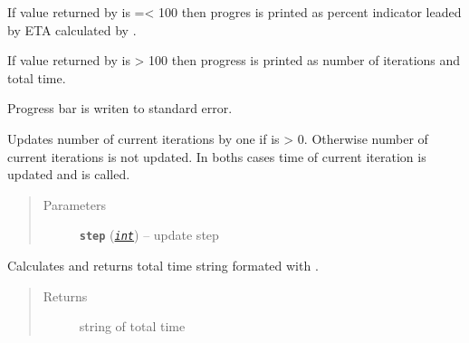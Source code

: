 \documentclass[a4paper,10pt,english]{sphinxmanual}
\begin{document}
\begin{fulllineitems}
\begin{fulllineitems}
If value returned by {\hyperref[aqueduct.utils.clui:aqueduct.utils.clui.SimpleProgressBar.percent]{}} is =\textless{} 100 then progres is printed as
percent indicator leaded by ETA calculated by {\hyperref[aqueduct.utils.clui:aqueduct.utils.clui.SimpleProgressBar.ETA]{}}.

If value returned by {\hyperref[aqueduct.utils.clui:aqueduct.utils.clui.SimpleProgressBar.percent]{}} is \textgreater{} 100 then progress is printed as
number of iterations and total time.

Progress bar is writen to standard error.

\end{fulllineitems}


\begin{fulllineitems}
\label{aqueduct.utils.clui:aqueduct.utils.clui.SimpleProgressBar.heartbeat}
\end{fulllineitems}


\begin{fulllineitems}
\label{aqueduct.utils.clui:aqueduct.utils.clui.SimpleProgressBar.update}
Updates number of current iterations  by one if  is \textgreater{} 0.
Otherwise number of current iterations is not updated.
In boths cases time of current iteration  is updated and
{\hyperref[aqueduct.utils.clui:aqueduct.utils.clui.SimpleProgressBar.show]{}} is called.
\begin{quote}\begin{description}
\item[{Parameters}] \leavevmode
\textbf{\texttt{step}} (\href{http://docs.python.org/2/library/functions.html\#int}{\emph{\texttt{int}}}) -- update step

\end{description}\end{quote}

\end{fulllineitems}


\begin{fulllineitems}
\label{aqueduct.utils.clui:aqueduct.utils.clui.SimpleProgressBar.ttime}
Calculates and returns total time string formated with {\hyperref[aqueduct.utils.clui:aqueduct.utils.clui.smart_time_string]{}}.
\begin{quote}\begin{description}
\item[{Returns}] \leavevmode
string of total time


\end{description}
\end{quote}
\end{fulllineitems}
\end{fulllineitems}
\end{document}
